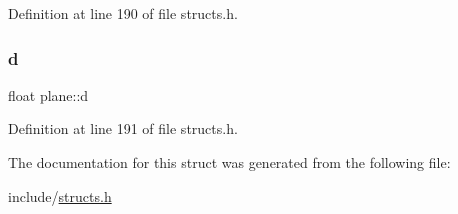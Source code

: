 Definition at line 190 of file structs.\+h.

\mbox{\label{structplane_a9a3cb65698785bad8199e7afbd083e27}} 
\subsubsection{\texorpdfstring{d}{d}}
{\footnotesize\ttfamily float plane\+::d}



Definition at line 191 of file structs.\+h.



The documentation for this struct was generated from the following file\+:\begin{DoxyCompactItemize}
\item 
include/\mbox{\hyperlink{structs_8h}{structs.\+h}}\end{DoxyCompactItemize}
